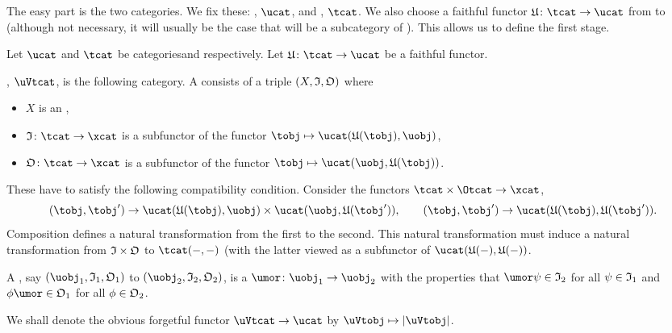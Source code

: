 \documentclass[%
12pt,%
arxiv,%
defaults
]{myclass}
\begin{document}
\medskip

The easy part is the two categories.
We fix these: \ucat, \(\ucat\), and \tcat, \(\tcat\).
We also choose a faithful functor \(\ufunc \colon \tcat \to \ucat\) from \tcat to \ucat (although not necessary, it will usually be the case that \tcat will be a subcategory of \ucat).
This allows us to define the first stage.

\begin{defn}
Let \(\ucat\) and \(\tcat\) be categories\emhyp{}\ucat and \tcat respectively.
Let \(\ufunc \colon \tcat \to \ucat\) be a faithful functor.

\uVtcatu, \(\uVtcat\), is the following category.
A \emph{\uVtobj{}} consists of a triple \((X, \itest, \otest)\) where
%
\begin{itemize}
\item \(X\) is an \uobj,
\item \(\itest \colon \tcat \to \xcat\) is a subfunctor of the functor \(\tobj \mapsto \Hom{\ucat}{\ufunc(\tobj)}{\uobj}\),
\item \(\otest \colon \tcat \to \xcat\) is a subfunctor of the functor \(\tobj \mapsto \Hom{\ucat}{\uobj}{\ufunc(\tobj)}\).
\end{itemize}
%
These have to satisfy the following compatibility condition.
Consider the functors \(\tcat \times \Otcat \to \xcat\),
%
\[
(\tobj, \tobj') \to \Hom{\ucat}{\ufunc(\tobj)}{\uobj} \times \Hom{\ucat}{\uobj}{\ufunc(\tobj')},  \qquad (\tobj, \tobj') \to \Hom{\ucat}{\ufunc(\tobj)}{\ufunc(\tobj')}.
\]
%
Composition defines a natural transformation from the first to the second.
This natural transformation must induce a natural transformation from \(\itest \times \otest\) to \(\Hom{\tcat}{-}{-}\) (with the latter viewed as a subfunctor of \(\Hom{\ucat}{\ufunc(-)}{\ufunc(-)}\).

A \uVtmoralt, say \((\uobj_1, \itest_1, \otest_1)\) to  \((\uobj_2, \itest_2, \otest_2)\), is a \umor \(\umor \colon \uobj_1 \to \uobj_2\) with the properties that \(\umor \ifn \in \itest_2\) for all \(\ifn \in \itest_1\) and \(\ofn \umor \in \otest_1\) for all \(\ofn \in \otest_2\).

We shall denote the obvious forgetful functor \(\uVtcat \to \ucat\) by \(\uVtobj \mapsto \forfunc[\uVtobj]\).
\end{defn}
\end{document}
